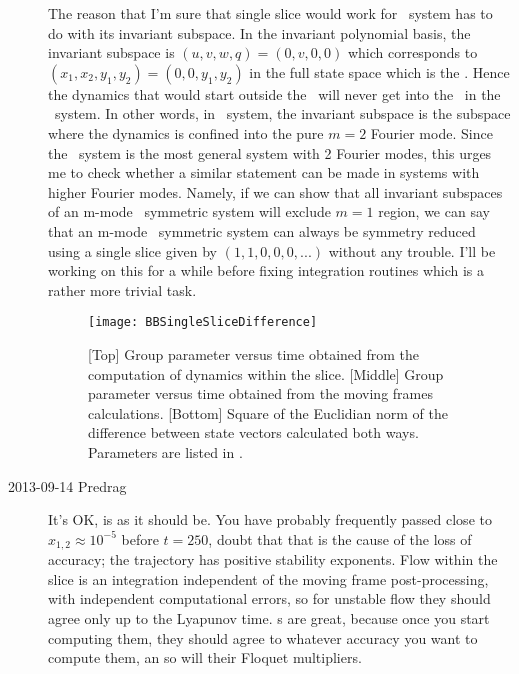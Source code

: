 \begin{description}
The reason that I'm sure that single slice would work for \twoMode\ system
has to do with its invariant subspace. In the invariant polynomial basis,
the invariant subspace is $(u,v,w,q) = (0,v,0,0)$ which corresponds to
$(x_1,x_2,y_1,y_2) = (0,0,y_1,y_2)$
in the full state space which is the \chartBord. Hence the dynamics that
would start outside the \chartBord\ will never get into the \chartBord\
in the \twoMode\ system. In other words, in \twoMode\ system, the invariant
subspace is the subspace where the dynamics is confined into the pure $m=2$
Fourier mode. Since the \twoMode\ system is the most general system with
2 Fourier modes, this urges me to check whether a similar statement can
be made in systems with higher Fourier modes. Namely, if we can show that
all invariant subspaces of an m-mode \ symmetric system will exclude
$m = 1$ region, we can say that an m-mode \SOn{2}\ symmetric system can always
be symmetry reduced using a single slice given by $(1,1,0,0,0,...)$ without
any trouble. I'll be working on this for a while before fixing integration
routines which is a rather more trivial task.

\begin{figure}%
  \begin{center}
  \texttt{[image: BBSingleSliceDifference]}
  \end{center}
  \caption{
  [Top] Group parameter versus time obtained from the computation of
  dynamics within the slice. [Middle] Group parameter versus time
  obtained from the moving frames calculations. [Bottom] Square of
  the Euclidian norm of the difference between state vectors
  calculated both ways. Parameters are listed in .
  }
  \label{fig:BBSingleSliceDifference}
\end{figure}

\item[2013-09-14 Predrag] It's OK, 
is as it should be. You have probably frequently passed close to $x_{1,2} \approx 10^{-5}$
before $t=250$, doubt that that is the cause of the loss of accuracy;
the trajectory has positive stability exponents.
Flow within the slice is an integration independent
of the moving frame post-processing, with independent computational
errors, so for unstable flow they should agree only up to the Lyapunov
time. \Rpo s are great, because once you start computing them, they should
agree to whatever accuracy you want to compute them, an so will their
Floquet multipliers.



\end{description}
